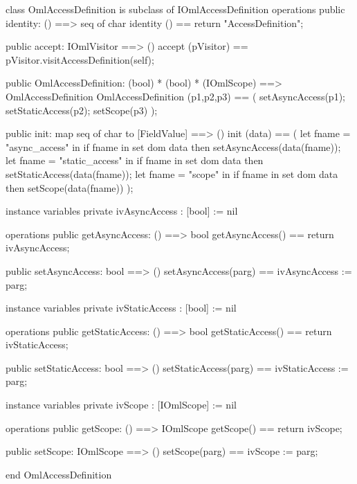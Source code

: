 \begin{vdm_al}
class OmlAccessDefinition is subclass of IOmlAccessDefinition
operations
  public identity: () ==> seq of char
  identity () == return "AccessDefinition";

  public accept: IOmlVisitor ==> ()
  accept (pVisitor) == pVisitor.visitAccessDefinition(self);

  public OmlAccessDefinition:
      (bool) *
      (bool) *
      (IOmlScope) ==> OmlAccessDefinition
  OmlAccessDefinition (p1,p2,p3) == 
   ( setAsyncAccess(p1);
     setStaticAccess(p2);
     setScope(p3) );

  public init: map seq of char to [FieldValue] ==> ()
  init (data) ==
    ( let fname = "async_access" in
        if fname in set dom data
        then setAsyncAccess(data(fname));
      let fname = "static_access" in
        if fname in set dom data
        then setStaticAccess(data(fname));
      let fname = "scope" in
        if fname in set dom data
        then setScope(data(fname)) );

instance variables
  private ivAsyncAccess : [bool] := nil

operations
  public getAsyncAccess: () ==> bool
  getAsyncAccess() == return ivAsyncAccess;

  public setAsyncAccess: bool ==> ()
  setAsyncAccess(parg) == ivAsyncAccess := parg;

instance variables
  private ivStaticAccess : [bool] := nil

operations
  public getStaticAccess: () ==> bool
  getStaticAccess() == return ivStaticAccess;

  public setStaticAccess: bool ==> ()
  setStaticAccess(parg) == ivStaticAccess := parg;

instance variables
  private ivScope : [IOmlScope] := nil

operations
  public getScope: () ==> IOmlScope
  getScope() == return ivScope;

  public setScope: IOmlScope ==> ()
  setScope(parg) == ivScope := parg;

end OmlAccessDefinition
\end{vdm_al}

